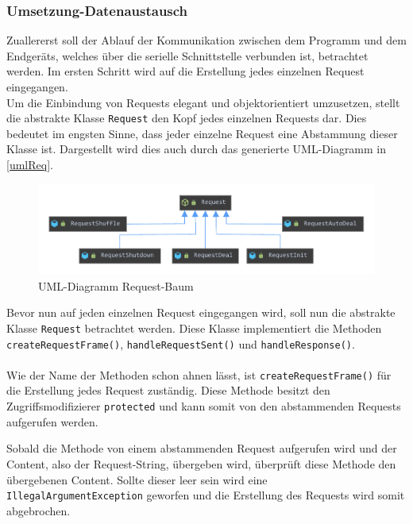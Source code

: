 \subsubsection{Umsetzung-Datenaustausch}
Zuallererst soll der Ablauf der Kommunikation zwischen dem Programm und dem Endgeräts, welches über die serielle Schnittstelle verbunden ist, betrachtet werden.
Im ersten Schritt wird auf die Erstellung jedes einzelnen Request eingegangen.\\
Um die Einbindung von Requests elegant und objektorientiert umzusetzen, stellt die abstrakte Klasse \lstinline[style=java]{Request} den Kopf jedes einzelnen Requests dar.
Dies bedeutet im engsten Sinne, dass jeder einzelne Request eine Abstammung dieser Klasse ist.
Dargestellt wird dies auch durch das generierte UML-Diagramm in \autoref{umlReq}.
\begin{figure}[H]
\centering
\vspace{-5mm}
\includegraphics[width=1\textwidth]{fig/ainf/RequestUML.pdf}
\caption{UML-Diagramm Request-Baum}
\label{umlReq}
\end{figure}
Bevor nun auf jeden einzelnen Request eingegangen wird, soll nun die abstrakte Klasse \lstinline[style=java]{Request} betrachtet werden.
Diese Klasse implementiert die Methoden \lstinline[style=java]{createRequestFrame()}, \lstinline[style=java]{handleRequestSent()} und \lstinline[style=java]{handleResponse()}.\\\\
Wie der Name der Methoden schon ahnen lässt, ist \lstinline[style=java]{createRequestFrame()} für die Erstellung jedes Request zuständig.
Diese Methode besitzt den Zugriffsmodifizierer \lstinline[style=java]{protected} und kann somit von den abstammenden Requests aufgerufen werden.

Sobald die Methode von einem abstammenden Request aufgerufen wird und der Content, also der Request-String, übergeben wird, überprüft diese Methode den übergebenen Content.
Sollte dieser leer sein wird eine \lstinline[style=java]{IllegalArgumentException} geworfen und die Erstellung des Requests wird somit abgebrochen.
